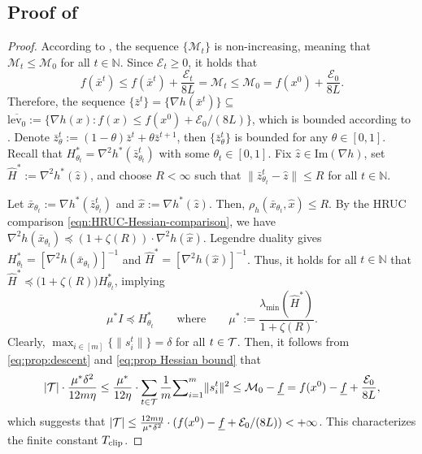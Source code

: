 \documentclass{article}
\theoremstyle{plain}
\theoremstyle{definition}
\theoremstyle{remark}
\newcommand{\N}{\mathbb{N}}
\newcommand{\sL}{L}
\newcommand{\cE}{\mathcal E}
\newcommand{\cM}{\mathcal{M}}
\begin{document}
\subsection{Proof of \texorpdfstring{}{Proposition }}
\label{appendix:proof of prop:finite many clip}
\begin{proof}
According to , the sequence $\{\cM_t\}$ is non-increasing, meaning that $\cM_t \leq \cM_0$ for all $t\in\N$. Since $\cE_t \geq 0$, it holds that \begin{equation*}  f(\bar x^t) \leq f(\bar x^t) + \frac{\cE_t}{8\sL}  = \cM_t \leq \cM_0 = f(x^0){}+\frac{\cE_0}{8\sL}. \end{equation*} 
Therefore, the sequence $\{\bar z^t\}=\{\nabla h(\bar x^t)\}\subseteq$ $\overline{\mathrm{lev}_0}:=\{\nabla h(x):f(x) \leq f(x^0){}+\cE_0/(8\sL)\}$, which is bounded according to . Denote $\bar z^t_\theta:=(1-\theta)\bar z^t + \theta \bar z^{t+1}$, then $\{\bar z^t_\theta\}$ is bounded for any $\theta\in[0,1]$. Recall that $H_{\theta_t}^*=\nabla^2 h^*(\bar z^t_{\theta_t})$ with some $\theta_t\in[0,1]$. Fix $\hat z\in\mathrm{Im}(\nabla h)$, set $\widehat{H}^*:=\nabla^2h^*(\hat z)$, and choose $R<\infty$ such that $\|\bar z^t_{\theta_t}-\hat z\|\leq R$ for all $t\in\N$. 

Let $\bar{x}_{\theta_t}:=\nabla h^*(\bar z^t_{\theta_t})$ and $\hat x:=\nabla h^*(\hat z)$. Then,
$\rho_h(\bar{x}_{\theta_t},\hat x)\leq R$. By the HRUC comparison \eqref{eqn:HRUC-Hessian-comparison}, we have
$\nabla^2h(\bar{x}_{\theta_t})
\preceq (1+\zeta(R))\cdot \nabla^2h(\hat x)
$. 
Legendre duality gives $H_{\theta_t}^*=[\nabla^2h(\bar{x}_{\theta_t})]^{-1}$ and $\widehat{H}^*=[\nabla^2h(\hat x)]^{-1}$. Thus, it holds for all $t\in\N$ that $\widehat{H}^*\preceq \big(1+\zeta(R)\big) H_{\theta_t}^*$, implying
\begin{equation}
    \label{eq:prop Hessian bound}
    \mu^* I \preceq H_{\theta_t}^*\qquad \text{where}\qquad \mu^*:=\frac{\lambda_{\min}(\widehat{H}^*)}{1+\zeta(R)}.
\end{equation}
Clearly, $\max_{i\in[m]}\{\|s_i^t\|\}=\delta$ for all $t\in{\cal T}$. Then, it follows from \eqref{eq:prop:descent} and \eqref{eq:prop Hessian bound} that  
$$|{\cal T}|\cdot\frac{\mu^*\delta^2}{12m\eta}\leq \frac{\mu^*}{12\eta}\cdot \sum_{t\in\mathcal{T}}\frac{1}{m}{\sum}_{i=1}^m\|s^t_i\|^2\leq \cM_0-\underline{f}=f(x^0)-\underline{f}{}+\frac{\cE_0}{8\sL},$$
which suggests that $|{\cal T}|\leq \frac{12m\eta}{\mu^*\delta^2}\cdot(f(x^0)-\underline{f}{}+\cE_0/(8\sL))<+\infty$. This characterizes the finite constant $T_{\rm clip}$. 
\end{proof}
\end{document}

